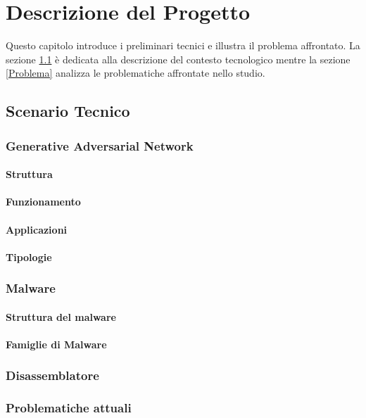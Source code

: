 \chapter{Descrizione del Progetto}
\label{cap:descrizione}

Questo capitolo introduce i preliminari tecnici e illustra il problema affrontato. La sezione \ref{Scenario} è dedicata alla descrizione del contesto tecnologico mentre la sezione \ref{Problema} analizza le problematiche affrontate nello studio. 

\section{Scenario Tecnico}
\label{Scenario}
\subsection{Generative Adversarial Network}
\subsubsection{Struttura}
\subsubsection{Funzionamento}
\subsubsection{Applicazioni}
\subsubsection{Tipologie}

\subsection{Malware}
\subsubsection{Struttura del malware}
\subsubsection{Famiglie di Malware}

\subsection{Disassemblatore}

\subsection{Problematiche attuali}






